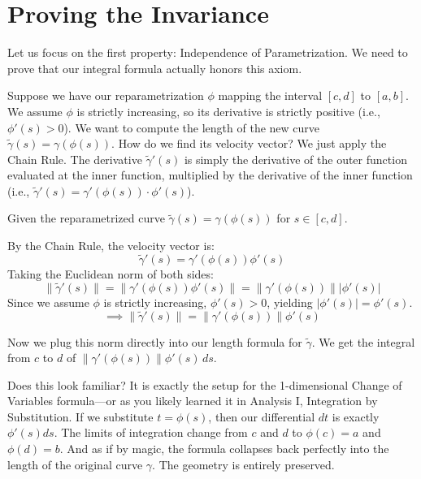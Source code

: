 
\section{Proving the Invariance}

\begin{spoken-clean}[00:17:30 - 00:18:45]
Let us focus on the first property: Independence of Parametrization. We need to prove that our integral formula actually honors this axiom. 

Suppose we have our reparametrization $\phi$ mapping the interval $[c, d]$ to $[a, b]$. We assume $\phi$ is strictly increasing, so its derivative is strictly positive (i.e., $\phi'(s) > 0$). We want to compute the length of the new curve $\tilde{\gamma}(s) = \gamma(\phi(s))$. How do we find its velocity vector? We just apply the Chain Rule. The derivative $\tilde{\gamma}'(s)$ is simply the derivative of the outer function evaluated at the inner function, multiplied by the derivative of the inner function (i.e., $\tilde{\gamma}'(s) = \gamma'(\phi(s)) \cdot \phi'(s)$).
\end{spoken-clean}

\begin{math-stroke}
Given the reparametrized curve $\tilde{\gamma}(s) = \gamma(\phi(s))$ for $s \in [c, d]$.

By the Chain Rule, the velocity vector is:
\[
\tilde{\gamma}'(s) = \gamma'(\phi(s)) \phi'(s)
\]
Taking the Euclidean norm of both sides:
\[
\|\tilde{\gamma}'(s)\| = \|\gamma'(\phi(s)) \phi'(s)\| = \|\gamma'(\phi(s))\| |\phi'(s)|
\]
Since we assume $\phi$ is strictly increasing, $\phi'(s) > 0$, yielding $|\phi'(s)| = \phi'(s)$.
\[
\implies \|\tilde{\gamma}'(s)\| = \|\gamma'(\phi(s))\| \phi'(s)
\]
\end{math-stroke}

\begin{spoken-clean}[00:18:45 - 00:20:00]
Now we plug this norm directly into our length formula for $\tilde{\gamma}$. We get the integral from $c$ to $d$ of $\|\gamma'(\phi(s))\| \phi'(s) \, ds$. 

Does this look familiar? It is exactly the setup for the 1-dimensional Change of Variables formula—or as you likely learned it in Analysis I, Integration by Substitution. If we substitute $t = \phi(s)$, then our differential $dt$ is exactly $\phi'(s) ds$. The limits of integration change from $c$ and $d$ to $\phi(c)=a$ and $\phi(d)=b$. And as if by magic, the formula collapses back perfectly into the length of the original curve $\gamma$. The geometry is entirely preserved.
\end{spoken-clean}

